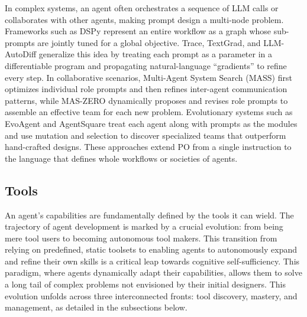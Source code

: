 \documentclass[10pt]{article} %
\begin{document}
In complex systems, an agent often orchestrates a sequence of LLM calls or collaborates with other agents, making prompt design a multi-node problem. Frameworks such as DSPy represent an entire workflow as a graph whose sub-prompts are jointly tuned for a global objective\citep{khattab2023dspy}. Trace\citep{wang2023trace}, TextGrad\citep{yellamraju2024textgrad}, and LLM-AutoDiff\citep{yin2025llm} generalize this idea by treating each prompt as a parameter in a differentiable program and propagating natural-language “gradients” to refine every step. In collaborative scenarios, Multi-Agent System Search (MASS)\citep{zhou2025maasprompt} first optimizes individual role prompts and then refines inter-agent communication patterns, while MAS-ZERO\citep{ke2025maszero} dynamically proposes and revises role prompts to assemble an effective team for each new problem. Evolutionary systems such as EvoAgent\citep{yuan2024evoagent} and AgentSquare\citep{shang2025agentsquare} treat each agent along with prompts as the modules and use mutation and selection to discover specialized teams that outperform hand-crafted designs. These approaches extend PO from a single instruction to the language that defines whole workflows or societies of agents.



\subsection{Tools}


An agent's capabilities are fundamentally defined by the tools it can wield. The trajectory of agent development is marked by a crucial evolution: from being mere tool users to becoming autonomous tool makers. This transition from relying on predefined, static toolsets to enabling agents to autonomously expand and refine their own skills is a critical leap towards cognitive self-sufficiency. This paradigm, where agents dynamically adapt their capabilities, allows them to solve a long tail of complex problems not envisioned by their initial designers. This evolution unfolds across three interconnected fronts: tool discovery, mastery, and management, as detailed in the subsections below.
\end{document}
